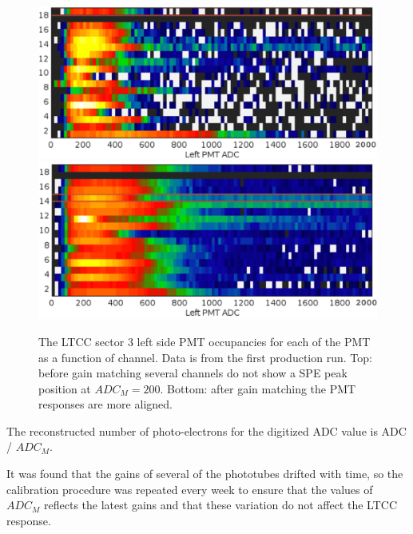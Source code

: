 \begin{figure}
	\centering
	\includegraphics[width=0.95\columnwidth,keepaspectratio]{img/gainMatchingBefore.png}
	\includegraphics[width=0.95\columnwidth,keepaspectratio]{img/gainMatchingAfter.png}
\caption{The LTCC sector 3 left side PMT occupancies for each of the PMT as a function of channel. Data is from the first production run. Top: before gain matching
		   several channels do not show a SPE peak position at  $ADC_M = 200$. Bottom: after gain matching the PMT responses are more aligned.}
	\label{fig:gainMatching}
\end{figure}

The reconstructed number of photo-electrons for the digitized ADC value is ADC / $ADC_M$.

It was found that the gains of several of the phototubes drifted with time, so the calibration procedure was repeated every week to ensure that
the values of $ADC_M$ reflects the latest gains and that these variation do not affect the LTCC response.



